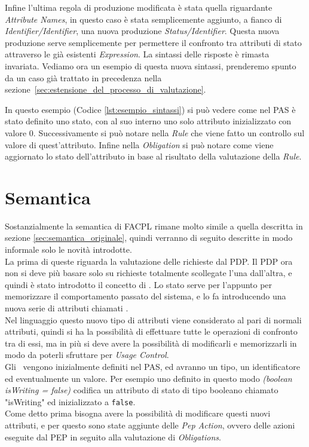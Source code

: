 Infine l'ultima regola di produzione modificata è stata quella riguardante \textit{Attribute Names}, in questo caso è stata semplicemente aggiunto, a fianco di \textit{Identifier/Identifier}, una nuova produzione \textit{Status/Identifier}. Questa nuova produzione serve semplicemente per permettere il confronto tra attributi di stato attraverso le già esistenti \textit{Expression}.
La sintassi delle risposte è rimasta invariata.
Vediamo ora un esempio di questa nuova sintassi, prenderemo spunto da un caso già trattato in precedenza nella sezione~\ref{sec:estensione_del_processo_di_valutazione}.

In questo esempio (Codice \ref{lst:esempio_sintassi}) si può vedere come nel PAS è stato definito uno stato, con al suo interno uno solo attributo inizializzato con valore 0.
Successivamente si può notare nella \textit{Rule} che viene fatto un controllo sul valore di quest'attributo.
Infine nella \textit{Obligation} si può notare come viene aggiornato lo stato dell'attributo in base al risultato della valutazione della \textit{Rule}.

\section{Semantica} %
\label{sec:semantica}
Sostanzialmente la semantica di FACPL rimane molto simile a quella descritta in sezione \ref{sec:semantica_originale}, quindi verranno di seguito descritte in modo informale solo le novità introdotte.\\
La prima di queste riguarda la valutazione delle richieste dal PDP. Il PDP ora non si deve più basare solo su richieste totalmente scollegate l'una dall'altra, e quindi è stato introdotto il concetto di \status.
Lo stato serve per l'appunto per memorizzare il comportamento passato del sistema, e lo fa introducendo una nuova serie di attributi chiamati \statusattribute.\\
Nel linguaggio questo nuovo tipo di attributi viene considerato al pari di normali attributi, quindi si ha la possibilità di effettuare tutte le operazioni di confronto tra di essi, ma in più si deve avere la possibilità di modificarli e memorizzarli in modo da poterli sfruttare per \textit{Usage Control}.\\
Gli \statusattribute \ vengono inizialmente definiti nel PAS, ed avranno un tipo, un identificatore ed eventualmente un valore. Per esempio uno \statusattribute definito in questo modo \textit{(boolean isWriting = false)} codifica un attributo di stato di tipo booleano chiamato "isWriting" ed inizializzato a \texttt{false}.\\
Come detto prima bisogna avere la possibilità di modificare questi nuovi attributi, e per questo sono state aggiunte delle \textit{Pep Action}, ovvero delle azioni eseguite dal PEP in seguito alla valutazione di \textit{Obligations}.
